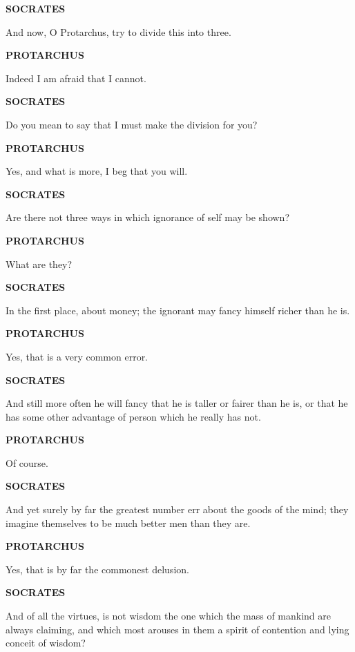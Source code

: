 \documentclass[11pt,letter]{article}
\begin{document}
\par \textbf{SOCRATES}
\par   And now, O Protarchus, try to divide this into three.

\par \textbf{PROTARCHUS}
\par   Indeed I am afraid that I cannot.

\par \textbf{SOCRATES}
\par   Do you mean to say that I must make the division for you?

\par \textbf{PROTARCHUS}
\par   Yes, and what is more, I beg that you will.

\par \textbf{SOCRATES}
\par   Are there not three ways in which ignorance of self may be shown?

\par \textbf{PROTARCHUS}
\par   What are they?

\par \textbf{SOCRATES}
\par   In the first place, about money; the ignorant may fancy himself richer than he is.

\par \textbf{PROTARCHUS}
\par   Yes, that is a very common error.

\par \textbf{SOCRATES}
\par   And still more often he will fancy that he is taller or fairer than he is, or that he has some other advantage of person which he really has not.

\par \textbf{PROTARCHUS}
\par   Of course.

\par \textbf{SOCRATES}
\par   And yet surely by far the greatest number err about the goods of the mind; they imagine themselves to be much better men than they are.

\par \textbf{PROTARCHUS}
\par   Yes, that is by far the commonest delusion.

\par \textbf{SOCRATES}
\par   And of all the virtues, is not wisdom the one which the mass of mankind are always claiming, and which most arouses in them a spirit of contention and lying conceit of wisdom?
\end{document}
